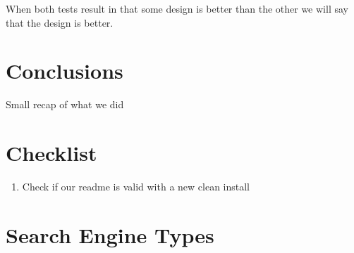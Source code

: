 \documentclass[12pt]{article}
\begin{document}
When both tests result in that some design is better than the other we will say that the design is better. %

\section{Conclusions}
\label{sec:conclusion}
Small recap of what we did

\section{Checklist}
\begin{enumerate}
\item Check if our readme is valid with a new clean install
\end{enumerate}




\appendix
\section{Search Engine Types}
\label{app:enginetypes}

\end{document}
